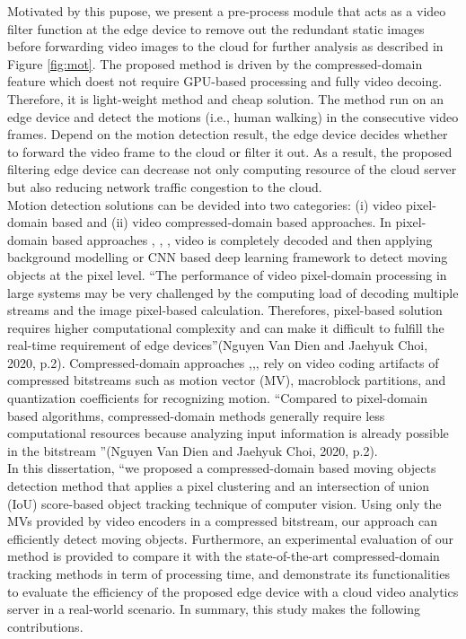  Motivated by this pupose, we present a pre-process module that acts as a video filter function at the edge device to remove out the redundant static images before forwarding video images to the cloud for further analysis as described in Figure \ref{fig:mot}. The proposed method is driven by the compressed-domain feature which doest not require GPU-based processing and fully video decoing. Therefore, it is light-weight method and cheap solution. The  method run on an edge device and detect the motions (i.e., human walking) in the consecutive video frames. Depend on the motion detection result, the edge device decides whether to forward the video frame to the cloud or filter it out. As a result, the proposed filtering edge device can decrease not only computing resource of the cloud server but also reducing network traffic congestion to the cloud. \\
Motion detection solutions can be devided into two categories: (i) video pixel-domain based and (ii) video compressed-domain based approaches. In pixel-domain based approaches \cite{lu2014moving}, \cite{kumar2016segmentation}, \cite{gujrathi2014detecting}, \cite{wang2019ground} video is completely decoded and then applying background modelling or CNN based deep learning framework to detect moving objects at the pixel level. “The performance of video pixel-domain processing in large systems may be very challenged by the computing load of decoding multiple streams and the image pixel-based calculation. Therefores, pixel-based solution requires higher computational complexity and can make it difficult to fulfill the real-time requirement of edge devices”(Nguyen Van Dien and Jaehyuk Choi, 2020, p.2). 
Compressed-domain approaches \cite{favalli2000object},\cite{yoneyama1999moving},\cite{dong2006object},\cite{achanta2002compressed} rely on video coding artifacts of compressed bitstreams such as motion vector (MV), macroblock partitions, and quantization coefficients for recognizing motion. “Compared to pixel-domain based algorithms, compressed-domain methods generally require less computational resources because analyzing input information is already possible in the bitstream ”(Nguyen Van Dien and Jaehyuk Choi, 2020, p.2). 
\\ In this dissertation, “we proposed a compressed-domain based moving objects detection method that applies a pixel clustering and an intersection of union (IoU) score-based object tracking technique of computer vision. Using only the MVs provided by video encoders in a compressed bitstream, our approach can efficiently detect moving objects. Furthermore, an experimental evaluation of our method is provided to compare it with the state-of-the-art compressed-domain tracking methods in term of processing time, and demonstrate its functionalities to evaluate the efficiency of the proposed edge device with a cloud video analytics server in a real-world scenario. In summary, this study makes the following contributions.
